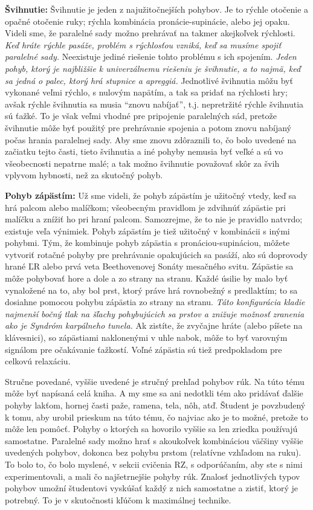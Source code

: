 \textbf{Švihnutie:} Švihnutie je jeden z najužitočnejších pohybov. Je to rýchle otočenie a opačné otočenie ruky; rýchla kombinácia pronácie-supinácie, alebo jej opaku. Videli sme, že paralelné sady možno prehrávať na takmer akejkoľvek rýchlosti. \emph{Keď hráte rýchle pasáže, problém s rýchlosťou vzniká, keď sa musíme spojiť paralelné sady.} Neexistuje jediné riešenie tohto problému s ich spojením. \emph{Jeden pohyb, ktorý je najbližšie k univerzálnemu riešeniu je švihnutie, a to najmä, keď sa jedná o palec, ktorý hrá stupnice a apreggiá.} Jednotlivé švihnutia môžu byť vykonané veľmi rýchlo, s nulovým napätím, a tak sa pridať na rýchlosti hry; avšak rýchle švihnutia sa musia “znovu nabíjať”, t.j. nepretržité rýchle švihnutia sú ťažké. To je však veľmi vhodné pre pripojenie paralelných sád, pretože švihnutie môže byť použitý pre prehrávanie spojenia a potom znovu nabíjaný počas hrania paralelnej sady. Aby sme znovu zdôraznili to, čo bolo uvedené na začiatku tejto časti, tieto švihnutia a iné pohyby nemusia byť veľké a sú vo všeobecnosti nepatrne malé; a tak možno švihnutie považovať skôr za švih vplyvom hybnosti, než za skutočný pohyb. 

\textbf{Pohyb zápästím:} Už sme videli, že pohyb zápästím je užitočný vtedy, keď sa hrá palcom alebo malíčkom; všeobecným pravidlom je zdvihnúť zápästie pri malíčku a znížiť ho pri hraní palcom. Samozrejme, že to nie je pravidlo natvrdo; existuje veľa výnimiek. Pohyb zápästím je tiež užitočný v kombinácii s inými pohybmi. Tým, že kombinuje pohyb zápästia s pronáciou-supináciou, môžete vytvoriť rotačné pohyby pre prehrávanie opakujúcich sa pasáží, ako sú doprovody hrané ĽR alebo prvá veta Beethovenovej Sonáty mesačného svitu. Zápästie sa môže pohybovať hore a dole a zo strany na stranu. Každé úsilie by malo byť vynaložené na to, aby bol prst, ktorý práve hrá rovnobežný s predlaktím; to sa dosiahne pomocou pohybu zápästia zo strany na stranu. \emph{Táto konfigurácia kladie najmenší bočný tlak na šľachy pohybujúcich sa prstov a znižuje možnosť zranenia ako je Syndróm karpálneho tunela.} Ak zistíte, že zvyčajne hráte (alebo píšete na klávesnici), so zápästiami naklonenými v uhle nabok, môže to byť varovným signálom pre očakávanie ťažkostí. Voľné zápästia sú tiež predpokladom pre celkovú relaxáciu. 

Stručne povedané, vyššie uvedené je stručný prehľad pohybov rúk. Na túto tému môže byť napísaná celá kniha. A my sme sa ani nedotkli tém ako pridávať ďalšie pohyby lakťom, hornej časti paže, ramena, tela, nôh, atď. Študent je povzbudený k tomu, aby urobil prieskum na túto tému, čo najviac ako je to možné, pretože to môže len pomôcť. Pohyby o ktorých sa hovorilo vyššie sa len zriedka používajú samostatne. Paralelné sady možno hrať s akoukoľvek kombináciou väčšiny vyššie uvedených pohybov, dokonca bez pohybu prstom (relatívne vzhľadom na ruku). To bolo to, čo bolo myslené, v sekcii cvičenia RZ, s odporúčaním, aby ste s nimi experimentovali, a mali čo najšetrnejšie pohyby rúk. Znalosť jednotlivých typov pohybov umožní študentovi vyskúšať každý z nich samostatne a zistiť, ktorý je potrebný. To je v skutočnosti kľúčom k maximálnej technike. 

